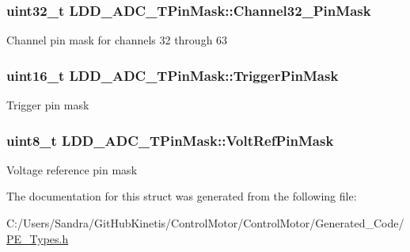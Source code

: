 \subsubsection[{\texorpdfstring{Channel32\+\_\+63\+Pin\+Mask}{Channel32_63PinMask}}]{\setlength{\rightskip}{0pt plus 5cm}uint32\+\_\+t L\+D\+D\+\_\+\+A\+D\+C\+\_\+\+T\+Pin\+Mask\+::\+Channel32\+\_\+Pin\+Mask}\hypertarget{struct_l_d_d___a_d_c___t_pin_mask_acd6bf6f512fb6e8cd170188dc663a4d8}{}\label{struct_l_d_d___a_d_c___t_pin_mask_acd6bf6f512fb6e8cd170188dc663a4d8}
Channel pin mask for channels 32 through 63 
\subsubsection[{\texorpdfstring{Trigger\+Pin\+Mask}{TriggerPinMask}}]{\setlength{\rightskip}{0pt plus 5cm}uint16\+\_\+t L\+D\+D\+\_\+\+A\+D\+C\+\_\+\+T\+Pin\+Mask\+::\+Trigger\+Pin\+Mask}\hypertarget{struct_l_d_d___a_d_c___t_pin_mask_a004a4d3a4f4071684e6676f64322215f}{}\label{struct_l_d_d___a_d_c___t_pin_mask_a004a4d3a4f4071684e6676f64322215f}
Trigger pin mask 
\subsubsection[{\texorpdfstring{Volt\+Ref\+Pin\+Mask}{VoltRefPinMask}}]{\setlength{\rightskip}{0pt plus 5cm}uint8\+\_\+t L\+D\+D\+\_\+\+A\+D\+C\+\_\+\+T\+Pin\+Mask\+::\+Volt\+Ref\+Pin\+Mask}\hypertarget{struct_l_d_d___a_d_c___t_pin_mask_a556430a91304e7db634bda25091b892c}{}\label{struct_l_d_d___a_d_c___t_pin_mask_a556430a91304e7db634bda25091b892c}
Voltage reference pin mask 

The documentation for this struct was generated from the following file\+:\begin{DoxyCompactItemize}
\item 
C\+:/\+Users/\+Sandra/\+Git\+Hub\+Kinetis/\+Control\+Motor/\+Control\+Motor/\+Generated\+\_\+\+Code/\hyperlink{_p_e___types_8h}{P\+E\+\_\+\+Types.\+h}\end{DoxyCompactItemize}
